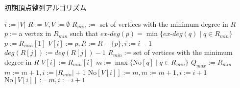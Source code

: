 \begin{algorithm}[htbp]
    \caption{初期頂点整列アルゴリズム}
    \label{alg:EXTEND-SORT}
    \small
    \begin{algorithmic}[1]
		\State $i:=|V|$ 
		\State $R:=V,V:=\emptyset$
		\State $R_{min}:=$ set of vertices with the minimum degree in $R$
				\State $p:=$a vertex in $R_{min}$ such that $ex$-$deg(p) = \min \{ ex$-$deg(q) \mid q \in R_{min} \}$
			\Else \  $p := R_{min}[1]$
			\EndIf
			\State $V[i] := p , R := R - \{ p \} , i := i-1$
			 
					\State $deg(R[j]) := deg( R[j] ) - 1 $
				\EndIf
			\EndFor
			\State $R_{min} := $set of vertices with the minimum degree in $R$
		\EndWhile
		\State {}
		 
			\State $V[i] := R_{min}[i]$
		\EndFor
		\State $m := \max\{ \mathrm{No}[q] \mid q \in R_{min} \} $
			\State $Q_{max} := R_{min}$
		\EndIf
		\State $m := m+1 , i:= |R_{min}| + 1$ 
			\State $\mathrm{No}[V[i]] := m , m:=m+1,i:=i+1$
		\EndWhile
			\State $\mathrm{No}[V[i]] := m ,i:=i+1$
		\EndWhile
	\EndProcedure
    \end{algorithmic}

\end{algorithm}


